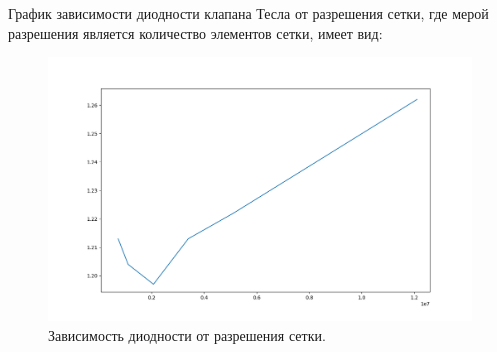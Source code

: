 \documentclass[14pt,a4paper]{article}
\begin{document}
        График зависимости диодности клапана Тесла от разрешения сетки, где мерой разрешения является количество элементов сетки, имеет вид:
        
        \begin{figure}[H]
            \centering
            \includegraphics[width = 1\linewidth]{graphDi1}
            \caption{Зависимость диодности от разрешения сетки.}
            \label{fig:graphDi1}
        \end{figure}
                                    
\end{document}
